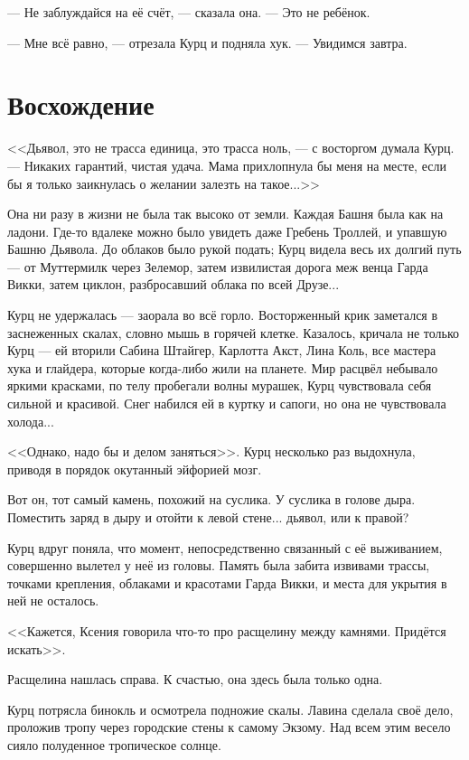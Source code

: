 --- Не заблуждайся на её счёт, --- сказала она.
--- Это не ребёнок.

--- Мне всё равно, --- отрезала Курц и подняла хук.
--- Увидимся завтра.

\section{Восхождение}

<<Дьявол, это не трасса единица, это трасса ноль, --- с восторгом думала Курц.
--- Никаких гарантий, чистая удача.
Мама прихлопнула бы меня на месте, если бы я только заикнулась о желании залезть на такое...>>

\asterism

Она ни разу в жизни не была так высоко от земли.
Каждая Башня была как на ладони.
Где-то вдалеке можно было увидеть даже Гребень Троллей, и упавшую Башню Дьявола.
До облаков было рукой подать;
Курц видела весь их долгий путь --- от Муттермилк через Зелемор, затем извилистая дорога меж венца Гарда Викки, затем циклон, разбросавший облака по всей Друзе...

Курц не удержалась --- заорала во всё горло.
Восторженный крик заметался в заснеженных скалах, словно мышь в горячей клетке.
Казалось, кричала не только Курц --- ей вторили Сабина Штайгер, Карлотта Акст, Лина Коль, все мастера хука и глайдера, которые когда-либо жили на планете.
Мир расцвёл небывало яркими красками, по телу пробегали волны мурашек, Курц чувствовала себя сильной и красивой.
Снег набился ей в куртку и сапоги, но она не чувствовала холода...

<<Однако, надо бы и делом заняться>>.
Курц несколько раз выдохнула, приводя в порядок окутанный эйфорией мозг.

Вот он, тот самый камень, похожий на суслика.
У суслика в голове дыра.
Поместить заряд в дыру и отойти к левой стене... дьявол, или к правой?

Курц вдруг поняла, что момент, непосредственно связанный с её выживанием, совершенно вылетел у неё из головы.
Память была забита извивами трассы, точками крепления, облаками и красотами Гарда Викки, и места для укрытия в ней не осталось.

<<Кажется, Ксения говорила что-то про расщелину между камнями.
Придётся искать>>.

Расщелина нашлась справа.
К счастью, она здесь была только одна.

\asterism

Курц потрясла бинокль и осмотрела подножие скалы.
Лавина сделала своё дело, проложив тропу через городские стены к самому Экзому.
Над всем этим весело сияло полуденное тропическое солнце.

